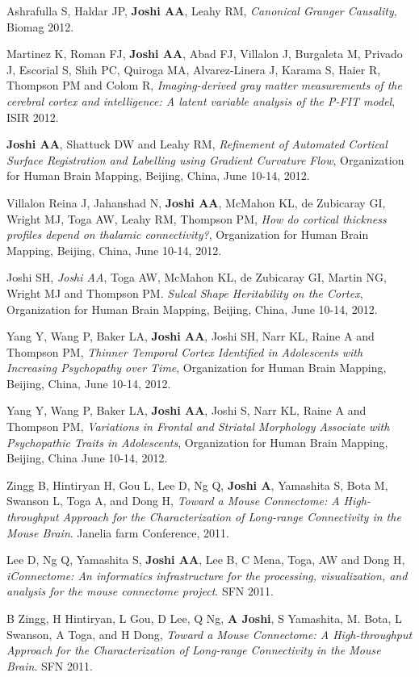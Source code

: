 \documentclass[overlapped,line,letterpaper]{res}
\begin{document}
\begin{resume}
Ashrafulla S, Haldar JP, \textbf{Joshi AA}, Leahy RM, \textit{Canonical Granger Causality}, Biomag 2012.

Martinez K, Roman FJ, \textbf{Joshi AA}, Abad FJ, Villalon J, Burgaleta M, Privado J, Escorial S, Shih PC, Quiroga MA, Alvarez-Linera J, Karama S, Haier R, Thompson PM and Colom R, \textit{Imaging-derived gray matter measurements of the cerebral cortex and intelligence: A latent variable analysis of the P-FIT model}, ISIR 2012.

\textbf{Joshi AA}, Shattuck DW and Leahy RM, \textit{Refinement of Automated Cortical Surface Registration and Labelling using Gradient Curvature Flow}, Organization for Human Brain Mapping, Beijing, China, June 10-14, 2012.

Villalon Reina J, Jahanshad N, \textbf{Joshi AA}, McMahon KL, de Zubicaray GI, Wright MJ, Toga AW, Leahy RM, Thompson PM, \textit{How do cortical thickness profiles depend on thalamic connectivity?}, Organization for Human Brain Mapping, Beijing, China, June 10-14, 2012.

Joshi SH, \textit{Joshi AA}, Toga AW, McMahon KL, de Zubicaray GI, Martin NG, Wright MJ and Thompson PM. \textit{Sulcal Shape Heritability on the Cortex}, Organization for Human Brain Mapping, Beijing, China, June 10-14, 2012.

Yang Y, Wang P, Baker LA, \textbf{Joshi AA}, Joshi SH, Narr KL, Raine A and Thompson PM, \textit{Thinner Temporal Cortex Identified in Adolescents with Increasing Psychopathy over Time}, Organization for Human Brain Mapping, Beijing, China, June 10-14, 2012.

Yang Y, Wang P, Baker LA, \textbf{Joshi AA}, Joshi S, Narr KL, Raine A and Thompson PM, \textit{Variations in Frontal and Striatal Morphology Associate with Psychopathic Traits in Adolescents}, Organization for Human Brain Mapping, Beijing, China June 10-14, 2012.

Zingg B, Hintiryan H, Gou L, Lee D, Ng Q, \textbf{Joshi A}, Yamashita S, Bota M, Swanson L, Toga A, and Dong H, \textit{Toward a Mouse Connectome: A High-throughput Approach for the Characterization of Long-range Connectivity in the Mouse Brain}. Janelia farm Conference, 2011.

Lee D, Ng Q, Yamashita S, \textbf{Joshi AA}, Lee B, C Mena, Toga, AW and Dong H, \textit{iConnectome: An informatics infrastructure for the processing, visualization, and analysis for the mouse connectome project}. SFN 2011.

B Zingg, H Hintiryan, L Gou, D Lee, Q Ng, \textbf{A Joshi}, S Yamashita, M. Bota, L Swanson, A Toga, and H Dong, \textit{Toward a Mouse Connectome: A High-throughput Approach for the Characterization of Long-range Connectivity in the Mouse Brain}. SFN 2011.


\end{resume}
\end{document}
